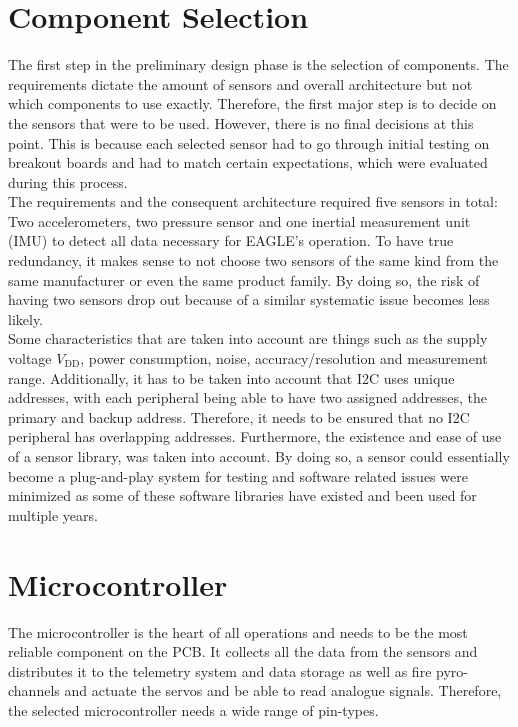 \documentclass[fontsize=11pt,%
twoside,%
BCOR          = 8mm, %
DIV           = 11,  %
titlepage     = off,%
index=totoc,%
xcolor        = pdftex,%
dvipsnames,%
bibliography  = totoc,%
bibliography = numbered, %
listof        = notnumbered]{scrreprt}
\begin{document}
\section{Component Selection}
The first step in the preliminary design phase is the selection of components. The requirements dictate the amount of sensors and overall architecture but not which components to use exactly. Therefore, the first major step is to decide on the sensors that were to be used. However, there is no final decisions at this point. This is because each selected sensor had to go through initial testing on breakout boards and had to match certain expectations, which were evaluated during this process.\\
The requirements and the consequent architecture required five sensors in total: Two accelerometers, two pressure sensor and one inertial measurement unit (IMU) to detect all data necessary for EAGLE's operation. To have true redundancy, it makes sense to not choose two sensors of the same kind from the same manufacturer or even the same product family. By doing so, the risk of having two sensors drop out because of a similar systematic issue becomes less likely.\\
Some characteristics that are taken into account are things such as the supply voltage $V_\text{DD}$, power consumption, noise, accuracy/resolution and measurement range. Additionally, it has to be taken into account that I2C uses unique addresses, with each peripheral being able to have two assigned addresses, the primary and backup address. Therefore, it needs to be ensured that no I2C peripheral has overlapping addresses. Furthermore, the existence and ease of use of a sensor library, was taken into account. By doing so, a sensor could essentially become a plug-and-play system for testing and software related issues were minimized as some of these software libraries have existed and been used for multiple years.

\section{Microcontroller}
The microcontroller is the heart of all operations and needs to be the most reliable component on the PCB. It collects all the data from the sensors and distributes it to the telemetry system and data storage as well as fire pyro-channels and actuate the servos and be able to read analogue signals. Therefore, the selected microcontroller needs a wide range of pin-types.
\end{document}
